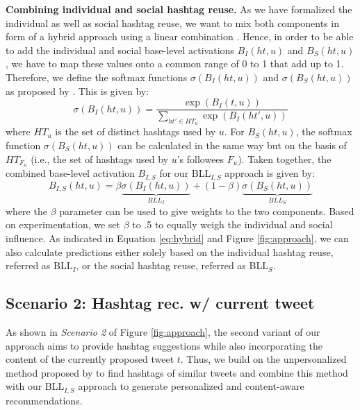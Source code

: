 \documentclass{sig-alternate-05-2015}
\newcommand{\para}[1]{\vspace{2mm}\noindent\textbf{#1}}
\begin{document}
\para{Combining individual and social hashtag reuse.}
As we have formalized the individual as well as social hashtag reuse, we want to mix both components in form of a hybrid approach using a linear combination \cite{jaschke2008tag}. Hence, in order to be able to add the individual and social base-level activations $B_I(ht, u)$ and $B_S(ht, u)$, we have to map these values onto a common range of 0 to 1 that add up to 1. Therefore, we define the softmax functions $\sigma(B_I(ht,u))$ and $\sigma(B_S(ht,u))$ as proposed by \cite{mcauley2013hidden,www_bll}. This is given by:
\begin{equation} \label{eq:sm}
	\sigma(B_I(ht,u)) = \frac{\exp(B_I(t, u))}{\sum\limits_{ht' \in HT_{u}}{\exp(B_I(ht', u))}}
 \end{equation}
where $HT_u$ is the set of distinct hashtags used by $u$. For $B_S(ht, u)$, the softmax function $\sigma(B_S(ht,u))$ can be calculated in the same way but on the basis of $HT_{F_u}$ (i.e., the set of hashtags used by $u$'s followees $F_u$). 
Taken together, the combined base-level activation $B_{I,S}$ for our BLL$_{I,S}$ approach is given by:
\begin{equation}  \label{eq:hybrid}
	B_{I,S}(ht,u) = \beta \underbrace{\sigma(B_I(ht, u))}_{BLL_I} + (1 - \beta) \underbrace{\sigma(B_S(ht, u))}_{BLL_S}
\end{equation}
where the $\beta$ parameter can be used to give weights to the two components. Based on experimentation, we set $\beta$ to .5 to equally weigh the individual and social influence. As indicated in Equation \ref{eq:hybrid} and Figure \ref{fig:approach}, we can also calculate predictions either solely based on the individual hashtag reuse, referred as BLL$_I$, or the social hashtag reuse, referred as BLL$_S$.

\subsection{Scenario 2: Hashtag rec. w/ current tweet} \label{sec:hashtagrec}
As shown in \textit{Scenario 2}{} of Figure \ref{fig:approach}, the second variant of our approach aims to provide hashtag suggestions while also incorporating the content of the currently proposed tweet $t$. Thus, we build on the unpersonalized method proposed by \cite{zangerle2011recommending} to find hashtags of similar tweets and combine this method with our BLL$_{I,S}${} approach to generate personalized and content-aware recommendations.
\end{document}
